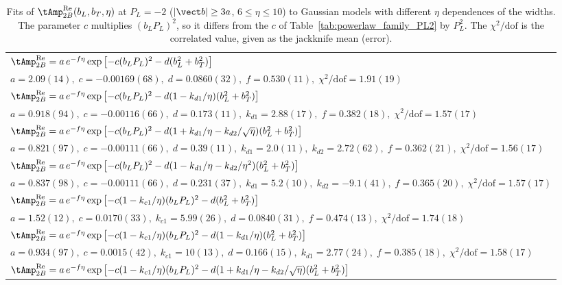 \begin{table}
\caption{Fits of $\tAmp_{2B}^{\text{Re}}(b_L,b_T,\eta)$ at $P_L=-2$ ($|\vect b|\ge3a$, $6\le\eta\le10$) to Gaussian models with different $\eta$ dependences of the widths. The parameter $c$ multiplies $(b_LP_L)^2$, so it differs from the $c$ of Table~\ref{tab:powerlaw_family_PL2} by $P_L^2$. The $\chi^2/\mathrm{dof}$ is the correlated value, given as the jackknife mean (error).}
\label{tab:gauss_family_PL2}
\scriptsize
\begin{ruledtabular}
\begin{tabular}{l}
$\tAmp_{2B}^{\text{Re}}=a\,e^{-f\eta}\exp\left[-c(b_LP_L)^2-d(b_L^2+b_T^2)\right]$ \\
$a=2.09(14),\;c=-0.00169(68),\;d=0.0860(32),\;f=0.530(11),\;\chi^2/\mathrm{dof}=1.91(19)$ \\[4pt]
$\tAmp_{2B}^{\text{Re}}=a\,e^{-f\eta}\exp\left[-c(b_LP_L)^2-d(1-k_{d1}/\eta)(b_L^2+b_T^2)\right]$ \\
$a=0.918(94),\;c=-0.00116(66),\;d=0.173(11),\;k_{d1}=2.88(17),\;f=0.382(18),\;\chi^2/\mathrm{dof}=1.57(17)$ \\[4pt]
$\tAmp_{2B}^{\text{Re}}=a\,e^{-f\eta}\exp\left[-c(b_LP_L)^2-d(1+k_{d1}/\eta-k_{d2}/\sqrt{\eta})(b_L^2+b_T^2)\right]$ \\
$a=0.821(97),\;c=-0.00111(66),\;d=0.39(11),\;k_{d1}=2.0(11),\;k_{d2}=2.72(62),\;f=0.362(21),\;\chi^2/\mathrm{dof}=1.56(17)$ \\[4pt]
$\tAmp_{2B}^{\text{Re}}=a\,e^{-f\eta}\exp\left[-c(b_LP_L)^2-d(1-k_{d1}/\eta-k_{d2}/\eta^2)(b_L^2+b_T^2)\right]$ \\
$a=0.837(98),\;c=-0.00111(66),\;d=0.231(37),\;k_{d1}=5.2(10),\;k_{d2}=-9.1(41),\;f=0.365(20),\;\chi^2/\mathrm{dof}=1.57(17)$ \\[4pt]
$\tAmp_{2B}^{\text{Re}}=a\,e^{-f\eta}\exp\left[-c(1-k_{c1}/\eta)(b_LP_L)^2-d(b_L^2+b_T^2)\right]$ \\
$a=1.52(12),\;c=0.0170(33),\;k_{c1}=5.99(26),\;d=0.0840(31),\;f=0.474(13),\;\chi^2/\mathrm{dof}=1.74(18)$ \\[4pt]
$\tAmp_{2B}^{\text{Re}}=a\,e^{-f\eta}\exp\left[-c(1-k_{c1}/\eta)(b_LP_L)^2-d(1-k_{d1}/\eta)(b_L^2+b_T^2)\right]$ \\
$a=0.934(97),\;c=0.0015(42),\;k_{c1}=10(13),\;d=0.166(15),\;k_{d1}=2.77(24),\;f=0.385(18),\;\chi^2/\mathrm{dof}=1.58(17)$ \\[4pt]
$\tAmp_{2B}^{\text{Re}}=a\,e^{-f\eta}\exp\left[-c(1-k_{c1}/\eta)(b_LP_L)^2-d(1+k_{d1}/\eta-k_{d2}/\sqrt{\eta})(b_L^2+b_T^2)\right]$ \\

\end{tabular}
\end{ruledtabular}
\end{table}
